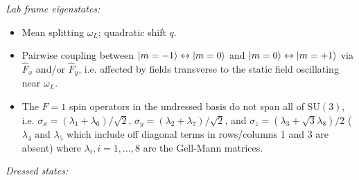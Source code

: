 \documentclass[aps,prl,reprint,superscriptaddress,floatfix]{revtex4-1}
\begin{document}
\textit{Lab frame eigenstates:}
\begin{itemize}
    \item[\checkmark] Mean splitting $\omega_L$; quadratic shift $q$.
    \item[\checkmark] Pairwise coupling between $\vert m=-1 \rangle  \leftrightarrow \vert m=0 \rangle $ and $\vert m=0 \rangle  \leftrightarrow \vert m=+1 \rangle $ via $\hat{F}_x$ and/or $\hat{F}_y$, i.e. affected by fields transverse to the static field oscillating near $\omega_L$.
    \item The $F=1$ spin operators in the undressed basis do not span all of $\text{SU}(3)$, i.e. $\sigma_x = (\lambda_1 + \lambda_6)/\sqrt{2}$, $\sigma_y = (\lambda_2 + \lambda_7)/\sqrt{2}$, and $\sigma_z = (\lambda_3 + \sqrt{3} \lambda_8)/2$ ($\lambda_4$ and $\lambda_5$ which include off diagonal terms in rows/columns 1 and 3 are absent) where $\lambda_i, i = 1,\dots,8$ are the Gell-Mann matrices.
\end{itemize}
\textit{Dressed states:}
\end{document}
